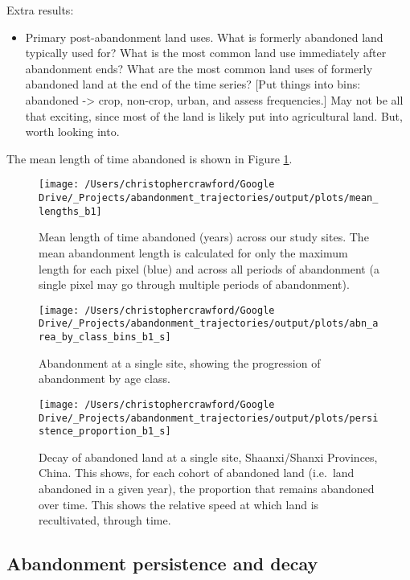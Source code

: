 \documentclass[
]{article}
\providecommand{\tightlist}{%
  \setlength{\itemsep}{0pt}\setlength{\parskip}{0pt}}
\begin{document}
Extra results:

\begin{itemize}
\tightlist
\item
  Primary post-abandonment land uses. What is formerly abandoned land typically used for? What is the most common land use immediately after abandonment ends? What are the most common land uses of formerly abandoned land at the end of the time series? {[}Put things into bins: abandoned -\textgreater{} crop, non-crop, urban, and assess frequencies.{]} May not be all that exciting, since most of the land is likely put into agricultural land. But, worth looking into.
\end{itemize}

The mean length of time abandoned is shown in Figure \ref{fig:mean-abn-length}.



\begin{figure}
\texttt{[image: /Users/christophercrawford/Google Drive/\_Projects/abandonment\_trajectories/output/plots/mean\_lengths\_b1]} \caption{Mean length of time abandoned (years) across our study sites. The mean abandonment length is calculated for only the maximum length for each pixel (blue) and across all periods of abandonment (a single pixel may go through multiple periods of abandonment).}\label{fig:mean-abn-length}
\end{figure}



\begin{figure}
\texttt{[image: /Users/christophercrawford/Google Drive/\_Projects/abandonment\_trajectories/output/plots/abn\_area\_by\_class\_bins\_b1\_s]} \caption{Abandonment at a single site, showing the progression of abandonment by age class.}\label{fig:abn-age-class}
\end{figure}



\begin{figure}
\texttt{[image: /Users/christophercrawford/Google Drive/\_Projects/abandonment\_trajectories/output/plots/persistence\_proportion\_b1\_s]} \caption{Decay of abandoned land at a single site, Shaanxi/Shanxi Provinces, China. This shows, for each cohort of abandoned land (i.e.~land abandoned in a given year), the proportion that remains abandoned over time. This shows the relative speed at which land is recultivated, through time.}\label{fig:abn-decay}
\end{figure}

\hypertarget{abandonment-persistence-and-decay}{%
\subsection{Abandonment persistence and decay}\label{abandonment-persistence-and-decay}}
\end{document}
